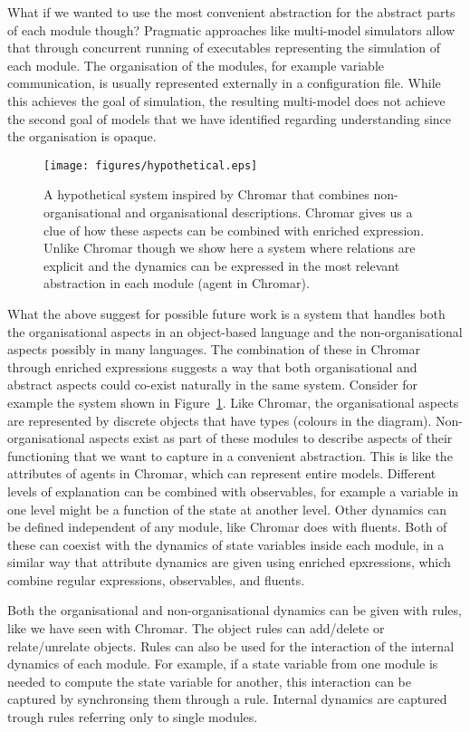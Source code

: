 \documentclass[phd]{infthesis}
\begin{document}
What if we wanted to use the most convenient abstraction for the abstract parts
of each module though? Pragmatic approaches like multi-model simulators
\citep{erbm_mois_2015,cis_2018} allow that through concurrent running of
executables representing the simulation of each module. The organisation of the
modules, for example variable communication, is usually represented externally
in a configuration file. While this achieves the goal of simulation, the
resulting multi-model does not achieve the second goal of models that we have
identified regarding understanding since the organisation is opaque.

\begin{figure}[tb]
  \centering
  \texttt{[image: figures/hypothetical.eps]}
  \caption{A hypothetical system inspired by Chromar that combines
    non-organisational and organisational descriptions. Chromar gives us a clue
    of how these aspects can be combined with enriched expression. Unlike
    Chromar though we show here a system where relations are explicit and the
    dynamics can be expressed in the most relevant abstraction in each module
    (agent in Chromar).}
    \label{fig:hyp}
\end{figure}

What the above suggest for possible future work is a system that handles both
the organisational aspects in an object-based language and the
non-organisational aspects possibly in many languages. The combination of these
in Chromar through enriched expressions suggests a way that both organisational
and abstract aspects could co-exist naturally in the same system. Consider for
example the system shown in Figure~\ref{fig:hyp}. Like Chromar, the
organisational aspects are represented by discrete objects that have types
(colours in the diagram). Non-organisational aspects exist as part of these
modules to describe aspects of their functioning that we want to capture in a
convenient abstraction. This is like the attributes of agents in Chromar, which
can represent entire models. Different levels of explanation can be combined
with observables, for example a variable in one level might be a function of the
state at another level. Other dynamics can be defined independent of any module,
like Chromar does with fluents. Both of these can coexist with the dynamics of
state variables inside each module, in a similar way that attribute dynamics are
given using enriched epxressions, which combine regular expressions,
observables, and fluents.

Both the organisational and non-organisational dynamics can be given with rules,
like we have seen with Chromar. The object rules can add/delete or
relate/unrelate objects. Rules can also be used for the interaction of the
internal dynamics of each module. For example, if a state variable from one
module is needed to compute the state variable for another, this interaction can
be captured by synchronsing them through a rule. Internal dynamics are captured
trough rules referring only to single modules.
\end{document}
